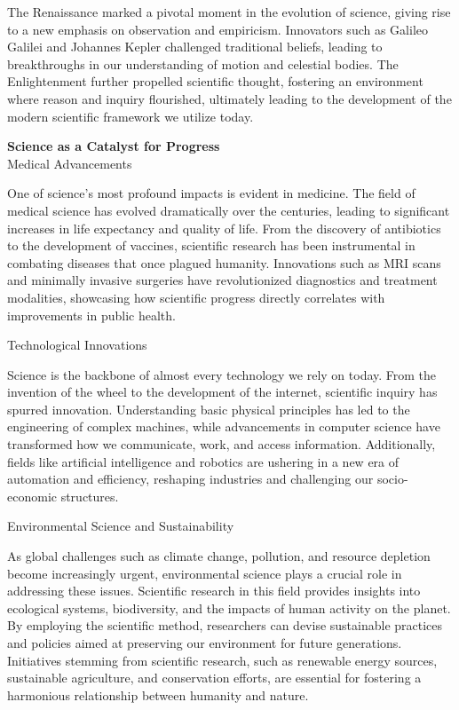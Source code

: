 \documentclass[12pt, a4paper, twocolumn]{article}
\begin{document}
The Renaissance marked a pivotal moment in the evolution of science, giving rise to a new emphasis on observation and empiricism. Innovators such as Galileo Galilei and Johannes Kepler challenged traditional beliefs, leading to breakthroughs in our understanding of motion and celestial bodies. The Enlightenment further propelled scientific thought, fostering an environment where reason and inquiry flourished, ultimately leading to the development of the modern scientific framework we utilize today.

\textbf{Science as a Catalyst for Progress}\\

Medical Advancements

One of science's most profound impacts is evident in medicine. The field of medical science has evolved dramatically over the centuries, leading to significant increases in life expectancy and quality of life. From the discovery of antibiotics to the development of vaccines, scientific research has been instrumental in combating diseases that once plagued humanity. Innovations such as MRI scans and minimally invasive surgeries have revolutionized diagnostics and treatment modalities, showcasing how scientific progress directly correlates with improvements in public health.

Technological Innovations

Science is the backbone of almost every technology we rely on today. From the invention of the wheel to the development of the internet, scientific inquiry has spurred innovation. Understanding basic physical principles has led to the engineering of complex machines, while advancements in computer science have transformed how we communicate, work, and access information. Additionally, fields like artificial intelligence and robotics are ushering in a new era of automation and efficiency, reshaping industries and challenging our socio-economic structures.

Environmental Science and Sustainability

As global challenges such as climate change, pollution, and resource depletion become increasingly urgent, environmental science plays a crucial role in addressing these issues. Scientific research in this field provides insights into ecological systems, biodiversity, and the impacts of human activity on the planet. By employing the scientific method, researchers can devise sustainable practices and policies aimed at preserving our environment for future generations. Initiatives stemming from scientific research, such as renewable energy sources, sustainable agriculture, and conservation efforts, are essential for fostering a harmonious relationship between humanity and nature.
\end{document}
